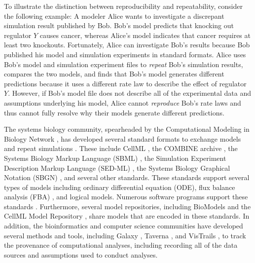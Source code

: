\documentclass[journal,transmag,twoside]{IEEEtran}
\begin{document}
To illustrate the distinction between reproducibility and repeatability, consider the following example: 
A modeler Alice wants to investigate a discrepant simulation result published by Bob. Bob's model predicts that knocking out regulator $Y$ causes cancer, whereas Alice's model indicates that cancer requires at least two knockouts. Fortunately, Alice can investigate Bob's results because Bob published his model and simulation experiments in standard formats. Alice uses Bob's model and simulation experiment files to \textit{repeat} Bob's simulation results, compares the two models, and finds that Bob's model generates different predictions because it uses a different rate law to describe the effect of regulator $Y$. 
However, if Bob's model file does not describe all of the experimental data and assumptions underlying his model, Alice cannot \textit{reproduce} Bob's rate laws and thus cannot fully resolve why their models generate different predictions.

The systems biology community, spearheaded by the Computational Modeling in Biology Network \cite{hucka2015promoting}, has developed several standard formats to exchange models and repeat simulations \cite{drager2014improving}. These include CellML \cite{cuellar2003overview}, the COMBINE archive \cite{COMBINE2012}, the Systems Biology Markup Language (SBML) \cite{hucka2003}, the Simulation Experiment Description Markup Language (SED-ML) \cite{sedml2011}, the Systems Biology Graphical Notation (SBGN) \cite{LeNovereHMMSS09}, and several other standards. These standards support several types of models including ordinary differential equation (ODE), flux balance analysis (FBA) \cite{orth2010flux}, and logical models. Numerous software programs support these standards \cite{hucka2011profile}. Furthermore, several model repositories, including BioModels \cite{chelliah2015biomodels} and the CellML Model Repository \cite{lloyd2008cellml}, share models that are encoded in these standards. In addition, the bioinformatics and computer science communities have developed several methods and tools, including Galaxy \cite{hillman2012using}, Taverna \cite{oinn2004taverna}, and VisTrails \cite{callahan2006vistrails}, to track the provenance of computational analyses, including recording all of the data sources and assumptions used to conduct analyses.
\end{document}
